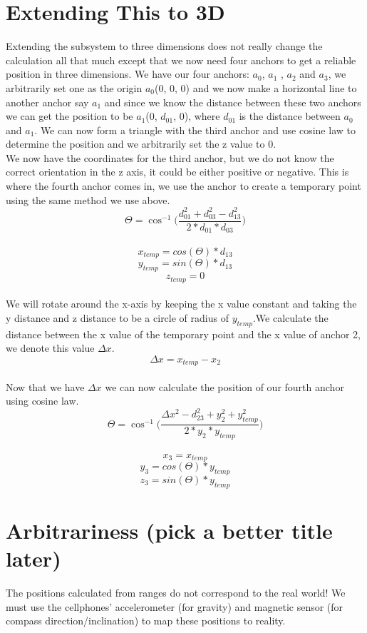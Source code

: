 \section{Extending This to 3D}
Extending the subsystem to three dimensions does not really change the calculation all that much except that we now need four anchors to get a reliable position in three dimensions. We have our four anchors: $a_{0}$, $a_{1}$ , $a_{2}$ and $a_{3}$, we arbitrarily set one as the origin $a_{0}$(0, 0, 0) and we now make a horizontal line to another anchor say $a_{1}$ and since we know the distance between these two anchors we can get the position to be $a_{1}$(0, $d_{01}$, 0), where $d_{01}$ is the distance between $a_{0}$ and $a_{1}$. We can now form a triangle with the third anchor and use cosine law to determine the position and we arbitrarily set the z value to 0.
\\
We now have the coordinates for the third anchor, but we do not know the correct orientation in the z axis, it could be either positive or negative. This is where the fourth anchor comes in, we use the anchor to create a temporary point using the same method we use above.
\\
\[ \Theta = \cos ^{ - 1}\Big(\frac{d_{01}^2 + d_{03}^2 - d_{13}^2 }{2*d_{01}*d_{03}}\Big)\]
\\
\[ x_{temp} = cos(\Theta) * d_{13} \]
\[ y_{temp} = sin(\Theta) *  d_{13} \]
\[ z_{temp} = 0 \]
\\
We will rotate around the x-axis by keeping the x value constant and taking the y distance and z distance to be a circle of radius of $y_{temp}$.We calculate the distance between the x value of the temporary point and the x value of anchor 2, we denote this value $\Delta x$.
\\
\[ \Delta x = x_{temp} - x_{2} \]
\\
Now that we have $\Delta x$ we can now calculate the position of our fourth anchor using cosine law.
\\
\[\Theta = \cos ^{ - 1}\Big(\frac {\Delta x^2 - d_{23}^2 + y_{2}^2 + y_{temp}^2}{2*y_{2}*y_{temp}}\Big)\]
\\
\[ x_{3} = x_{temp} \]
\[ y_{3} = cos(\Theta) * y_{temp} \]
\[ z_{3} = sin(\Theta) * y_{temp} \]


\section{Arbitrariness (pick a better title later)}
The positions calculated from ranges do not correspond to the real world! We must use the cellphones' accelerometer (for gravity) and magnetic sensor (for compass direction/inclination) to map these positions to reality.

